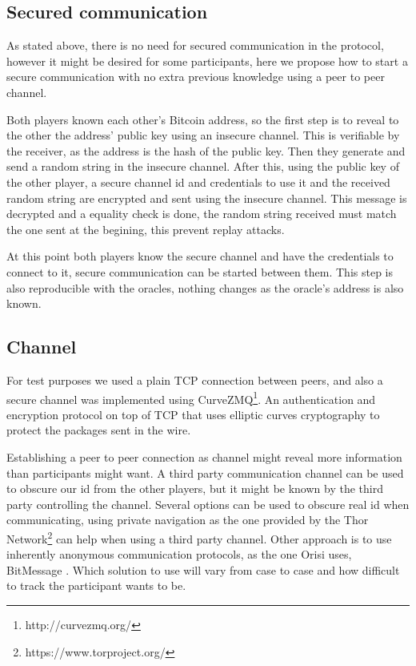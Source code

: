 \subsection{Secured communication} \label{subsec:secured_comm}

As stated above, there is no need for secured communication in the protocol,
  however it might be desired for some participants, here we propose how to
  start a secure communication with no extra previous knowledge using a peer
  to peer channel.

Both players known each other's Bitcoin address, so the first step is to
  reveal to the other the address' public key using an insecure channel.
This is verifiable by the receiver, as the address is the hash of the public
  key.
Then they generate and send a random string in the insecure channel.
After this, using the public key of the other player, a secure channel id and
  credentials to use it and the received random string are encrypted and sent
  using the insecure channel.
This message is decrypted and a equality check is done, the random string
  received must match the one sent at the begining, this prevent replay
  attacks.

At this point both players know the secure channel and have the credentials
  to connect to it, secure communication can be started between them. This
  step is also reproducible with the oracles, nothing changes as the oracle's
  address is also known.

\subsection{Channel}

For test purposes we used a plain TCP connection between peers, and also
  a secure channel was implemented using
  CurveZMQ\footnote{http://curvezmq.org/}.
An authentication and encryption protocol on top of TCP that uses elliptic
  curves cryptography to protect the packages sent in the wire.

Establishing a peer to peer connection as channel might reveal more information
  than participants might want.
A third party communication channel can be used to obscure our id from the other
  players, but it might be known by the third party controlling the channel.
Several options can be used to obscure real id when communicating, using private
  navigation as the one provided by the Thor Network\footnote{%
    https://www.torproject.org/} can help when using a third party channel.
Other approach is to use inherently anonymous communication protocols, as the
  one Orisi uses, BitMessage \cite{warren2012bitmessage}.
Which solution to use will vary from case to case and how difficult to track
  the participant wants to be.

